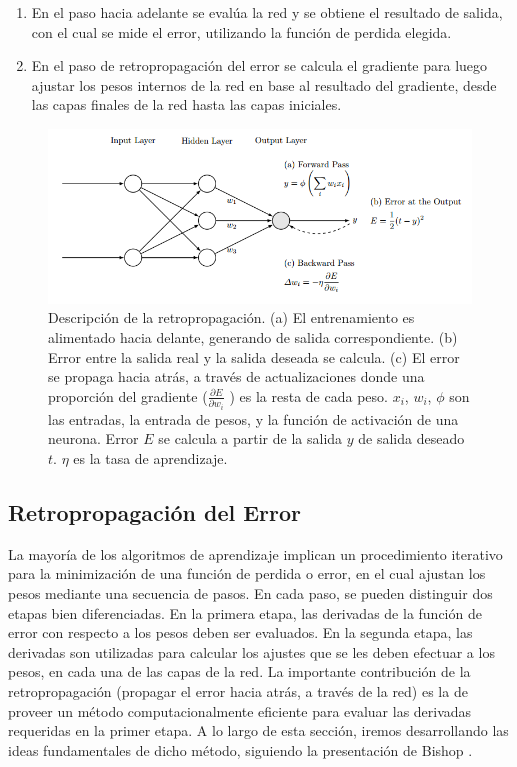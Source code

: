 \documentclass[a4paper,11pt,spanish]{book}
\begin{document}
	\begin{enumerate}
	  \item En el paso hacia adelante se evalúa la red y se obtiene el resultado de salida, con el cual se mide el error, utilizando la función de perdida elegida.
	  \item En el paso de retropropagación del error se calcula el gradiente para luego ajustar los pesos internos de la red en base al resultado del gradiente,
	    desde las capas finales de la red hasta las capas iniciales.
	\end{enumerate}
	
	\begin{figure}[h]
	  \begin{center}
	  \includegraphics[width=0.8\linewidth]{./img/backprop.png}
	  \end{center}
	  \caption{ Descripción de la retropropagación. (a) El entrenamiento es alimentado hacia delante, generando de salida correspondiente. (b) Error entre la salida real y la salida deseada
	  se calcula. (c) El error se propaga hacia atrás, a través de actualizaciones donde una proporción del gradiente ($ \frac{\partial E}{\partial w_i}$ ) es la resta de cada peso. $x_i$, $w_i$, $\phi$ son las entradas,
	  la entrada de pesos, y la función de activación de una neurona. Error $E$ se calcula a partir de la salida $y$ de salida deseado $t$. $\eta$ es la tasa de aprendizaje.
	  \cite{Automatic_differentiation_ML} }
	  \label{fig:backprop}
	\end{figure}

      \subsection{Retropropagación del Error} \label{sec:backpropagation}
	La mayoría de los algoritmos de aprendizaje implican un procedimiento iterativo para la minimización de una función de perdida o error, en el cual ajustan 
	los pesos mediante una secuencia de pasos. 
	En cada paso, se pueden distinguir dos etapas bien diferenciadas. En la primera etapa, las derivadas de la función de error con
	respecto a los pesos deben ser evaluados. 
	En la segunda etapa, las derivadas son utilizadas para calcular los ajustes que se les deben efectuar a los pesos, en cada una
	de las capas de la red. 
	La importante contribución de la retropropagación (propagar el error hacia atrás, a través de la red) es la de proveer un
	método computacionalmente eficiente para evaluar las derivadas requeridas en la primer etapa. 
	A lo largo de esta sección, iremos desarrollando las ideas fundamentales de dicho método, siguiendo la presentación de Bishop \cite{Bishop:MachineLearning}.
\end{document}

